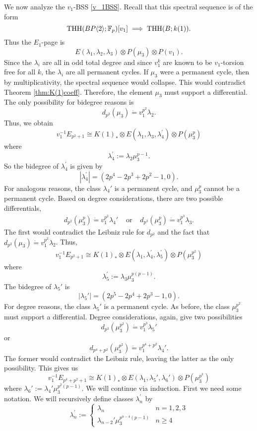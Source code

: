 We now analyze the $v_1$-BSS \eqref{v_1BSS}. Recall that this spectral sequence is of the form 
\[
\operatorname{THH}(BP\langle 2 \rangle;\mathbb{F}_p)[v_1]\implies \operatorname{THH}(B;k(1)).
\]
Thus the $E_1$-page is 
\begin{equation}\label{v_1bockinput}
E(\lambda_1, \lambda_2, \lambda_3)\otimes P(\mu_3)\otimes P(v_1). 
\end{equation}
Since the $\lambda_i$ are all in odd total degree and since $v_1^k$ are known to be $v_1$-torsion free for all $k$, the $\lambda_i$ are all permanent cycles. If $\mu_3$ were a permanent cycle, then by multiplicativity, the spectral sequence would collapse. This would contradict Theorem \ref{thm:K(1)coeff}. Therefore, the element $\mu_3$ must support a differential. The only possibility for bidegree reasons is
\[
d_{p^2}(\mu_3)\dot{=}v_1^{p^2}\lambda_2.
\]
Thus, we obtain 
\[
v_1^{-1}E_{p^2+1}\cong K(1)_*\otimes E(\lambda_1, \lambda_3,\lambda_4^{\prime})\otimes P(\mu_3^p)
\]
where 
\[
\lambda_4^{\prime}:= \lambda_2\mu_3^{p-1}.
\]
So the bidegree of $\lambda_4^{\prime}$ is given by 
\[
|\lambda_4^{\prime}|= (2p^4-2p^3+2p^2-1,0).
\]
For analogous reasons, the class $\lambda_4'$ is a permanent cycle, and $\mu_3^p$ cannot be a permanent cycle. Based on degree considerations, there are two possible differentials, 
\[
\begin{array}{ccc}
d_{p^2}(\mu_3^p)\dot{=} v_1^{p^2}\lambda_4' &\text{ or } &d_{p^3}(\mu_3^p)\dot{=}v_1^{p^3}\lambda_3.
\end{array}
\]
The first would contradict the Leibniz rule for $d_{p^2}$ and the fact that $d_{p^2}(\mu_3)\dot{=}v_1^{p^2}\lambda_2$. Thus, 
\[
v_1^{-1}E_{p^3+1}\cong K(1)_*\otimes E(\lambda_1, \lambda_4^{\prime}, \lambda_5^{\prime})\otimes P(\mu_3^{p^2})
\]
where
\[
\lambda_5^{\prime}:= \lambda_3\mu_3^{p(p-1)} .
\]
The bidegree of $\lambda_5'$ is 
\[
|\lambda_5'|=(2p^5-2p^4+2p^3-1,0).
\]
For degree reasons, the class $\lambda_5'$ is a permanent cycle. As before, the class $\mu_3^{p^2}$ must support a differential. Degree considerations, again, give two possibilities
\[
d_{p^3}(\mu_3^{p^2})\dot{=}v_1^{p^3}\lambda_5'
\]
or 
\[
d_{p^4+p^2}(\mu_3^{p^2}) \dot{=} v_1^{p^4+p^2}\lambda_4'.
\]
The former would contradict the Leibniz rule, leaving the latter as the only possibility. This gives us
\[
v_1^{-1}E_{p^4+p^2+1}\cong K(1)_*\otimes E(\lambda_1, \lambda_5', \lambda_6')\otimes P(\mu_3^{p^3})
\]
where $\lambda_6':= \lambda_4'\mu_3^{p^2(p-1)}$. We will continue via induction. First we need some notation. We will recursively define classes $\lambda_n^{\prime}$ by 
\[
\lambda_n^{\prime}:= \begin{cases}
	\lambda_n & n=1,2,3\\
	\lambda_{n-2}'\mu_3^{p^{n-4}(p-1)} & n\geq 4
\end{cases}
\]
